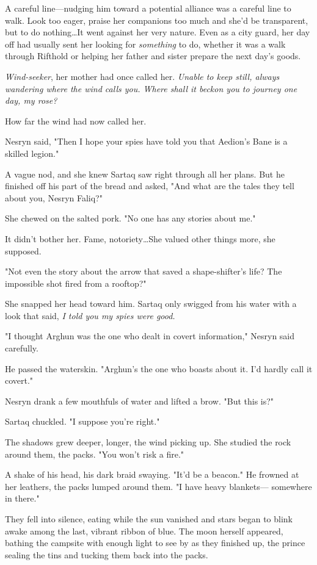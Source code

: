 A careful line---nudging him toward a potential alliance was a careful line to walk.
Look too eager, praise her companions too much and she'd be transparent, but to do nothing\ldots It went against her very nature.
Even as a city guard, her day off had usually sent her looking for \emph{something} to do, whether it was a walk through Rifthold or helping her father and sister prepare the next day's goods.

\emph{Wind-seeker}, her mother had once called her.
\emph{Unable to keep still, always wandering where the wind calls you.
Where shall it beckon you to journey one day, my rose?}

How far the wind had now called her.

Nesryn said, "Then I hope your spies have told you that Aedion's Bane is a skilled legion."

A vague nod, and she knew Sartaq saw right through all her plans.
But he finished off his part of the bread and asked, "And what are the tales they tell about you, Nesryn Faliq?"

She chewed on the salted pork.
"No one has any stories about me."

It didn't bother her.
Fame, notoriety\ldots She valued other things more, she supposed.

"Not even the story about the arrow that saved a shape-shifter's life?
The impossible shot fired from a rooftop?"

She snapped her head toward him.
Sartaq only swigged from his water with a look that said, \emph{I told you my spies were good.}

"I thought Arghun was the one who dealt in covert information," Nesryn said carefully.

He passed the waterskin.
"Arghun's the one who boasts about it.
I'd hardly call it covert."

Nesryn drank a few mouthfuls of water and lifted a brow.
"But this is?"

Sartaq chuckled.
"I suppose you're right."

The shadows grew deeper, longer, the wind picking up.
She studied the rock around them, the packs.
"You won't risk a fire."

A shake of his head, his dark braid swaying.
"It'd be a beacon."
He frowned at her leathers, the packs lumped around them.
"I have heavy blankets--- somewhere in there."

They fell into silence, eating while the sun vanished and stars began to blink awake among the last, vibrant ribbon of blue.
The moon herself appeared, bathing the campsite with enough light to see by as they finished up, the prince sealing the tins and tucking them back into the packs.

